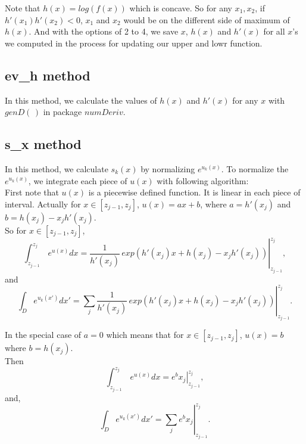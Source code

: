 \documentclass[11pt, oneside]{article}   	%
\begin{document}
Note that $h(x)=log(f(x))$ which is concave. So for any $x_1, x_2$, if $h'(x_1)h'(x_2)<0$, $x_1$ and $x_2$ would be on the different side of maximum of $h(x)$. And with the options of 2 to 4, we save $x$, $h(x)$ and $h'(x)$ for all $x$'s we computed in the process for updating our upper and lowr function.


\subsection*{ ev\_h method }
In this method, we calculate the values of $h(x)$ and $h'(x)$ for any $x$ with $genD(\,)$ in package $numDeriv$.

\subsection*{ s\_x method }
In this method, we calculate $s_{k}(x)$ by normalizing $e^{ u_{k}(x)}$. To normalize the $e^{ u_{k}(x)}$, we integrate each piece of $u(x)$ with following algorithm: \\
First note that $u(x)$ is a piecewise defined function. It is linear in each piece of interval. Actually for $x \in [z_{j-1}, z_j]$, $u(x) = ax+b $, where $a=h'(x_j)$ and $b=h(x_j)- x_j h'(x_j)$. \\
So for $x \in [z_{j-1}, z_j]$, 
\begin{displaymath}
\int_{z_{j-1}}^{z_j} \, e^{u(x)} dx =\left. \frac{1}{h'(x_j)} \, exp( h'(x_j)x + h(x_j) -x_j h'(x_j))  \right|_{z_{j-1}}^{z_j},
\end{displaymath}
and
\begin{displaymath}
\int_D e^{u_k(x')} dx' = \left.\sum_j \frac{1}{h'(x_j)} \,exp( h'(x_j)x + h(x_j) -x_j h'(x_j))  \right|_{z_{j-1}}^{z_j}.
\end{displaymath}

In the special case of $a=0$ which means that for $x \in [z_{j-1}, z_j]$, $u(x) = b $ where $b=h(x_j)$. \\Then
\begin{displaymath}
 \int_{z_{j-1}}^{z_j} \, e^{u(x)} dx =\left. e^bx_j\right|_{z_{j-1}}^{z_j} , 
\end{displaymath}
and, 
\begin{displaymath}
\int_D e^{u_k(x')} dx' =\left.\sum_j  e^bx_j\right|_{z_{j-1}}^{z_j}.
\end{displaymath}

\clearpage
\end{document}
